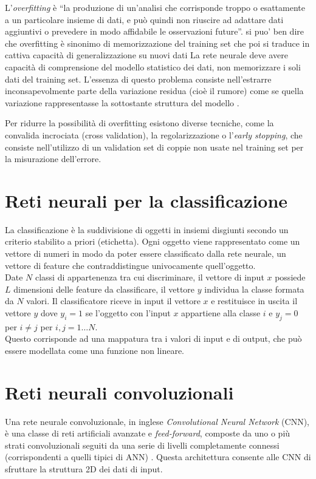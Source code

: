 L'\emph{overfitting} è ``la produzione di un'analisi che corrisponde troppo o esattamente a un particolare insieme di dati, e può quindi non riuscire ad adattare dati aggiuntivi o prevedere in modo affidabile le osservazioni future''.
{\color{red} si puo' ben dire che overfitting è sinonimo di memorizzazione del training set che poi si traduce in cattiva capacità di generalizzazione su nuovi dati}
La rete neurale deve avere capacità di comprensione del modello statistico dei dati, non memorizzare i soli dati del training set. L'essenza di questo problema consiste nell'estrarre inconsapevolmente parte della variazione residua (cioè il rumore) come se quella variazione rappresentasse la sottostante struttura del modello \cite{burnham2003model}.

Per ridurre la possibilità di overfitting esistono diverse tecniche, come la convalida incrociata (cross validation), la regolarizzazione o l'\emph{early stopping}, che consiste nell'utilizzo di un validation set di coppie non usate nel training set per la misurazione dell'errore.

\section{Reti neurali per la classificazione}
\label{sec:classificazione}
La classificazione è la suddivisione di oggetti in insiemi disgiunti secondo un criterio stabilito a priori (etichetta). Ogni oggetto viene rappresentato come un vettore di numeri in modo da poter essere classificato dalla rete neurale, un vettore di feature che contraddistingue univocamente quell'oggetto.\\

Date $N$ classi di appartenenza tra cui discriminare, il vettore di input $x$ possiede $L$ dimensioni delle feature da classificare, il vettore $y$ individua la classe formata da $N$ valori. Il classificatore riceve in input il vettore $x$ e restituisce in uscita il vettore $y$ dove $y_i=1$ se l'oggetto con l'input $x$ appartiene alla classe $i$ e $y_j=0$ per $i\neq j$ per $i,j=1 \dots N$.\\
Questo corrisponde ad una mappatura tra i valori di input e di output, che può essere modellata come una funzione non lineare.

\section{Reti neurali convoluzionali}
\label{sec:cnn}
Una rete neurale convoluzionale, in inglese \emph{Convolutional Neural Network} (CNN), è una classe di reti artificiali avanzate e \emph{feed-forward}, composte da uno o più strati convoluzionali seguiti da una serie di livelli completamente connessi (corrispondenti a quelli tipici di ANN) \cite{kim2014convolutional}. Questa architettura consente alle CNN di sfruttare la struttura 2D dei dati di input.\\

